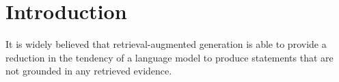 \section{Introduction}
It is widely believed that retrieval-augmented generation is able to provide a
reduction in the tendency of a language model to produce statements that are not
grounded in any retrieved evidence.
